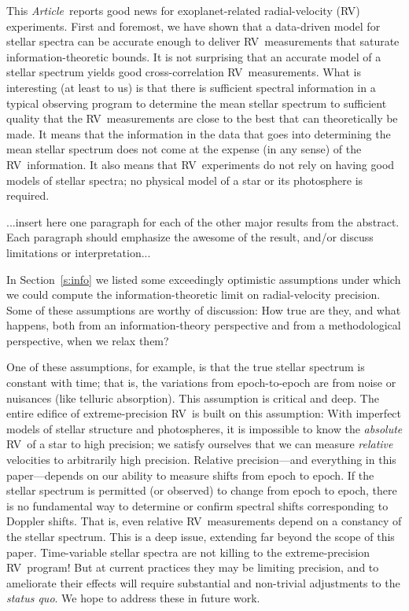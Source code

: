 \documentclass[modern]{aastex62}
\newcommand{\documentname}{\textsl{Article}}
\newcommand{\sectionname}{Section}
\newcommand{\acronym}[1]{{\small{#1}}}
\newcommand{\foreign}[1]{\textsl{#1}}
\newcommand{\RV}{\acronym{RV}}
\begin{document}
This \documentname\ reports good news for exoplanet-related
radial-velocity (\RV) experiments.
First and foremost, we have shown that a data-driven model for
stellar spectra can be accurate enough to deliver
\RV\ measurements that saturate information-theoretic
bounds.
It is not surprising that an accurate model of a stellar spectrum
yields good cross-correlation \RV\ measurements.
What is interesting (at least to us) is that there is sufficient
spectral information in a typical observing
program to determine the mean stellar spectrum to sufficient
quality that the \RV\ measurements are close to the best that can
theoretically be made.
It means that the information in the data that goes into determining
the mean stellar spectrum does not come at the expense (in any sense)
of the \RV\ information.
It also means that \RV\ experiments do not rely on having good models
of stellar spectra; no physical model of a star or its photosphere
is required.

...insert here one paragraph for each of the other major results from
the abstract. Each paragraph should emphasize the awesome of the
result, and/or discuss limitations or interpretation...

In \sectionname~\ref{s:info} we listed some exceedingly
optimistic assumptions under which we could compute the
information-theoretic limit on radial-velocity precision.
Some of these assumptions are worthy of discussion: How true are they,
and what happens, both from an information-theory perspective and from
a methodological perspective, when we relax them?

One of these assumptions, for example, is that the true stellar
spectrum is constant with time; that is, the variations from
epoch-to-epoch are from noise or nuisances (like telluric absorption).
This assumption is critical and deep.
The entire edifice of extreme-precision \RV\ is built on this assumption:
With imperfect models of stellar structure and photospheres, it is
impossible to know the \emph{absolute} \RV\ of a star to high precision;
we satisfy ourselves that we can measure \emph{relative} velocities
to arbitrarily high precision.
Relative precision---and everything in this paper---depends on our
ability to measure shifts from epoch to epoch.
If the stellar spectrum is permitted (or observed) to change from epoch
to epoch, there is no fundamental way to determine or confirm spectral
shifts corresponding to Doppler shifts.
That is, even relative \RV\ measurements depend on a constancy of the
stellar spectrum.
This is a deep issue, extending far beyond the scope of this paper.
Time-variable stellar spectra are not killing to the extreme-precision
\RV\ program!
But at current practices they may be limiting precision,
and to ameliorate their effects will require substantial and non-trivial adjustments to the
\foreign{status quo}.
We hope to address these in future work.
\end{document}
